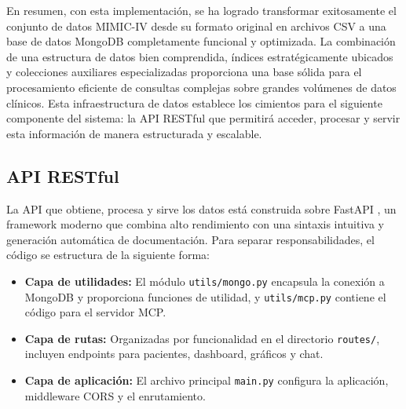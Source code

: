 En resumen, con esta implementación, se ha logrado transformar exitosamente el conjunto de datos MIMIC-IV desde su formato original en archivos CSV a una base de datos MongoDB completamente funcional y optimizada. La combinación de una estructura de datos bien comprendida, índices estratégicamente ubicados y colecciones auxiliares especializadas proporciona una base sólida para el procesamiento eficiente de consultas complejas sobre grandes volúmenes de datos clínicos. Esta infraestructura de datos establece los cimientos para el siguiente componente del sistema: la API RESTful que permitirá acceder, procesar y servir esta información de manera estructurada y escalable.










\subsection{API RESTful}

La API que obtiene, procesa y sirve los datos está construida sobre FastAPI \cite{fastapi}, un framework moderno que combina alto rendimiento con una sintaxis intuitiva y generación automática de documentación. Para separar responsabilidades, el código se estructura de la siguiente forma:

\begin{itemize}
\item \textbf{Capa de utilidades:} El módulo \texttt{utils/mongo.py} encapsula la conexión a MongoDB y proporciona funciones de utilidad, y \texttt{utils/mcp.py} contiene el código para el servidor MCP.
\item \textbf{Capa de rutas:} Organizadas por funcionalidad en el directorio \texttt{routes/}, incluyen endpoints para pacientes, dashboard, gráficos y chat.
\item \textbf{Capa de aplicación:} El archivo principal \texttt{main.py} configura la aplicación, middleware CORS y el enrutamiento.
\end{itemize}


